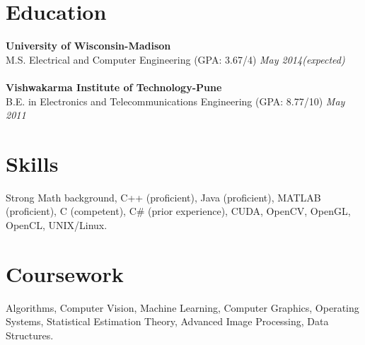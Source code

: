 \documentclass[margin]{res}
\begin{document}
 

 

\address{thite@wisc.edu\\www.linkedin.com/in/aashishthite\\https://github.com/aashishthite‎}
\address{\hfill 2110 University Avenue, Apt. 104, \\ \hfill Madison, WI-53726, USA.\\ \hfill (408) 601-9349}


\begin{resume} 
 

\section{Education} 
{\bf University of Wisconsin-Madison} \\
M.S. Electrical and Computer Engineering (GPA: 3.67/4) \hfill {\it May 2014(expected)} \\
\\
{\bf Vishwakarma Institute of Technology-Pune} \\
B.E. in Electronics and Telecommunications Engineering (GPA: 8.77/10) \hfill {\it May 2011}

\section{Skills}
Strong Math background, C++ (proficient), Java (proficient), MATLAB (proficient), C (competent), C\# (prior experience), CUDA, OpenCV, OpenGL, OpenCL, UNIX/Linux.

\section{Coursework}
Algorithms, Computer Vision, Machine Learning, Computer Graphics, 
Operating Systems, Statistical Estimation Theory, Advanced Image Processing, Data Structures.


\end{resume}
\end{document}
